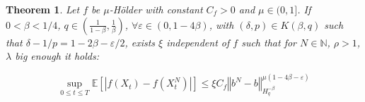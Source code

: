 \documentclass[11pt]{article}
\newtheorem{theo}{Theorem}
\newcommand{\norme}[1]{\left\Vert #1\right\Vert}
\newcommand{\N}{\mathbb{N}}
\newcommand{\E}{\mathbb{E}}
\begin{document}
\begin{theo}\label{main}
    Let $f$ be $\mu$-Hölder with constant $C_f>0$ and $\mu\in(0,1]$. If $0<\beta < 1/4$, $q\in\left(\frac{1}{1-\beta},\frac{1}{\beta}\right)$, $\forall \varepsilon \in(0,1-4\beta)$, with  $(\delta,p)\in K(\beta,q)$ such that $\delta - 1/p = 1-2\beta - \varepsilon/2$, exists $\xi$ independent of $f$ such that for $N\in\N$, $\rho>1$, $\lambda$ big enough it holds:
    
    \begin{equation}
    \underset{0\leq t\leq T} {\sup}\E\left[\left|f\left(X_t\right)-f\left(X_t^N\right)\right|\right] \leq \xi C_f \norme{b^N-b}_{H^{-\beta}_{q}}^{\mu\left(1-4\beta-\varepsilon\right)}
    \end{equation}
\end{theo}
\end{document}
